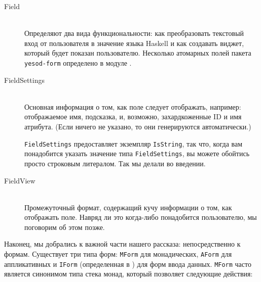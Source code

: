 \begin{description}
\item[Field] \hfill \\
Определяют два вида функциональности: как преобразовать текстовый вход от пользователя 
в значение языка Haskell и как создавать виджет, который будет показан пользователю.
Несколько атомарных полей пакета \lstinline'yesod-form' определено в модуле
 .

\item[FieldSettings] \hfill \\
Основная информация о том, как поле следует отображать, например: отображаемое имя,
подсказка, и, возможно, захардкоженные ID и имя атрибута. (Если ничего не указано, то они
генерируются автоматически.)

\begin{remark}
\lstinline'FieldSettings' предоставляет экземпляр \lstinline'IsString', так что, 
когда вам понадобится указать значение типа \lstinline'FieldSettings', вы можете 
обойтись просто строковым литералом. Так мы делали во введении.
\end{remark}

\item[FieldView] \hfill \\
Промежуточный формат, содержащий кучу информации о том, как отображать поле. 
Навряд ли это когда-либо понадобится пользователю, мы поговорим об этом позже.
\end{description}


Наконец, мы добрались к важной части нашего рассказа: непосредственно к формам. Существует
три типа форм: \lstinline'MForm' для монадических, \lstinline'AForm' для аппликативных и
\lstinline'IForm' (определенная в 
) 
для форм ввода данных. \lstinline'MForm' часто является синонимом типа стека 
монад, который позволяет следующие действия:

